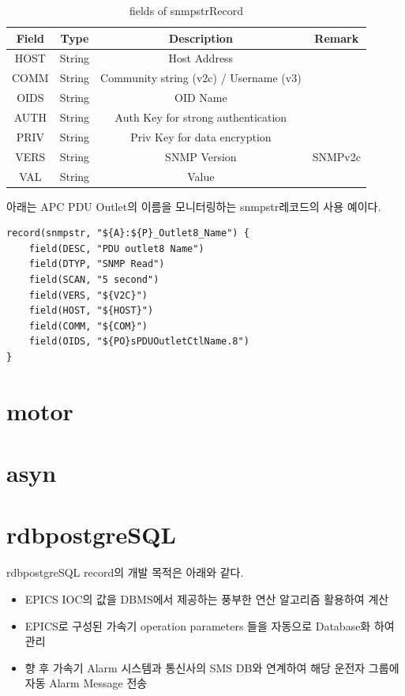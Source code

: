 \documentclass[11pt
  , a4paper
  , article
  , oneside
]{memoir}
\begin{document}
\begin{table}[!h]
\begin{center}
\begin{tabular}{cccc}\hline
Field & Type & Description & Remark\\ \hline
HOST & String & Host Address \\ \hline
COMM & String & Community string (v2c) / Username (v3) \\ \hline
OIDS & String & OID Name \\ \hline
AUTH & String & Auth Key for strong authentication \\ \hline
PRIV & String & Priv Key for data encryption\\ \hline
VERS & String & SNMP Version & SNMPv2c	 \\ \hline
VAL & String & Value \\ \hline
\end{tabular}
\caption{fields of snmpstrRecord}
\label{table:snmpstrrecord} 
\end{center}
\end{table} 

아래는 APC PDU Outlet의 이름을 모니터링하는 snmpstr레코드의 사용 예이다. 

{\scriptsize
\begin{verbatim}
record(snmpstr, "${A}:${P}_Outlet8_Name") {
    field(DESC, "PDU outlet8 Name")
    field(DTYP, "SNMP Read")
    field(SCAN, "5 second")
    field(VERS, "${V2C}")
    field(HOST, "${HOST}")
    field(COMM, "${COM}")
    field(OIDS, "${PO}sPDUOutletCtlName.8")
}
\end{verbatim}
}


\chapter{motor}

\chapter{asyn}

\chapter{rdbpostgreSQL}

rdbpostgreSQL record의 개발 목적은 아래와 같다.
\begin{itemize}
	\item EPICS IOC의 값을 DBMS에서 제공하는 풍부한 연산 알고리즘 활용하여 계산
	\item EPICS로 구성된 가속기 operation parameters 들을 자동으로 Database화 하여 관리
	\item 향 후 가속기 Alarm 시스템과 통신사의 SMS DB와 연계하여 해당 운전자 그룹에 자동 Alarm Message 전송
\end{itemize}
\end{document}
